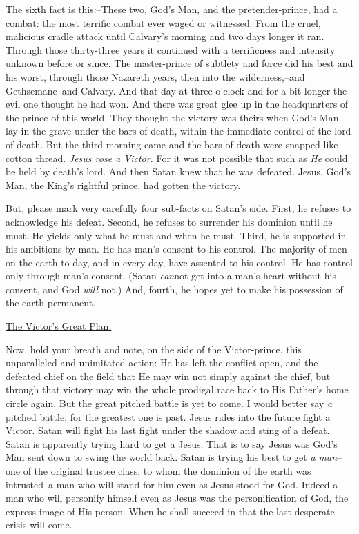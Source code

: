 The sixth fact is this:--These two, God's Man, and the pretender-prince,
had a combat: the most terrific combat ever waged or witnessed. From the
cruel, malicious cradle attack until Calvary's morning and two days longer
it ran. Through those thirty-three years it continued with a terrificness
and intensity unknown before or since. The master-prince of subtlety and
force did his best and his worst, through those Nazareth years, then into
the wilderness,--and Gethsemane--and Calvary. And that day at three
o'clock and for a bit longer the evil one thought he had won. And there
was great glee up in the headquarters of the prince of this world. They
thought the victory was theirs when God's Man lay in the grave under the
bars of death, within the immediate control of the lord of death. But the
third morning came and the bars of death were snapped like cotton thread.
\textit{Jesus rose a Victor.} For it was not possible that such as \textit{He} could be
held by death's lord. And then Satan knew that he was defeated. Jesus,
God's Man, the King's rightful prince, had gotten the victory.

But, please mark very carefully four sub-facts on Satan's side. First, he
refuses to acknowledge his defeat. Second, he refuses to surrender his
dominion until he must. He yields only what he must and when he must.
Third, he is supported in his ambitions by man. He has man's consent to
his control. The majority of men on the earth to-day, and in every day,
have assented to his control. He has control only through man's consent.
(Satan \textit{can}not get into a man's heart without his consent, and God \textit{will}
not.) And, fourth, he hopes yet to make his possession of the earth
permanent.



\underline{The Victor's Great Plan.}


Now, hold your breath and note, on the side of the Victor-prince, this
unparalleled and unimitated action: He has left the conflict open, and the
defeated chief on the field that He may win not simply against the chief,
but through that victory may win the whole prodigal race back to His
Father's home circle again. But the great pitched battle is yet to come. I
would better say \textit{a} pitched battle, for the greatest one is past. Jesus
rides into the future fight a Victor. Satan will fight his last fight
under the shadow and sting of a defeat. Satan is apparently trying hard to
get a Jesus. That is to say Jesus was God's Man sent down to swing the
world back. Satan is trying his best to get \textit{a man}--one of the original
trustee class, to whom the dominion of the earth was intrusted--a man who
will stand for him even as Jesus stood for God. Indeed a man who will
personify himself even as Jesus was the personification of God, the
express image of His person. When he shall succeed in that the last
desperate crisis will come.

